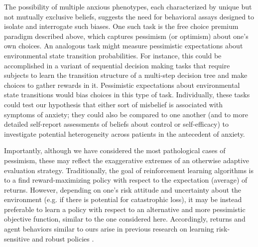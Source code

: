\documentclass[11pt]{article} %
\begin{document}
The possibility of multiple anxious phenotypes, each characterized by unique but not mutually exclusive beliefs, suggests the need for behavioral assays designed to isolate and interrogate such biases. One such task is the free choice premium paradigm described above, which captures pessimism (or optimism) about one's own choices. An analogous task might measure pessimistic expectations about environmental state transition probabilities. For instance, this could be accomplished in a variant of sequential decision making tasks that require subjects to learn the transition structure of a multi-step decision tree \citep{glascher2010, lee2014} and make choices to gather rewards in it. Pessimistic expectations about environmental state transitions would bias choices in this type of task. Individually, these tasks could test our hypothesis that either sort of misbelief is associated with symptoms of anxiety; they could also be compared to one another (and to more detailed self-report assessments of beliefs about control or self-efficacy) to investigate potential heterogeneity across patients in the antecedent of anxiety.

Importantly, although we have considered the most pathological cases of pessimism, these may reflect the exaggerative extremes of an otherwise adaptive evaluation strategy. Traditionally, the goal of reinforcement learning algorithms is to a find reward-maximizing policy with respect to the expectation (average) of returns. However, depending on one's risk attitude and uncertainty about the environment (e.g. if there is potential for catastrophic loss), it may be instead preferable to learn a policy with respect to an alternative and more pessimistic objective function, similar to the one considered here. Accordingly, returns and agent behaviors similar to ours arise in previous research on learning risk-sensitive and robust policies \cite{morimura2012, chow2015, bellemare2017}. 
\end{document}
